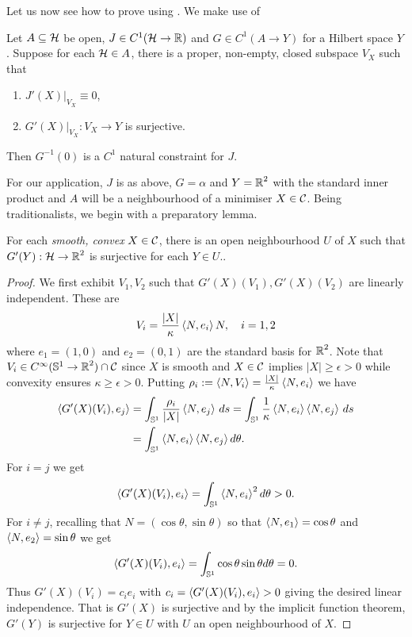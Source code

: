 \documentclass[12pt]{amsart}
\begin{document}
Let us now see how to prove  using . We make use of

\begin{prop}[{\cite[Proposition 2.2]{MR2997381}}]
\label{prop:nat}
Let $A \subseteq \operatorname{\mathcal{H}}$ be open, $J \in C^1(\operatorname{\mathcal{H}} \to \operatorname{\mathbb{R}})$ and $G \in C^1(A \to Y)$ for a Hilbert space $Y$. Suppose for each $\operatorname{\mathcal{H}} \in A$, there is a proper, non-empty, closed subspace $V_X$ such that
\begin{enumerate}
\item $J'(X)|_{V_X} \equiv 0$,
\item $G'(X)|_{V_X} : V_X \to Y$ is surjective.
\end{enumerate}
Then $G^{-1}(0)$ is a \(C^1\) natural constraint for $J$.
\end{prop}

For our application, \(J\) is as above, \(G = \alpha\) and \(Y = \operatorname{\mathbb{R}}^2\) with the standard inner product and $A$ will be a neighbourhood of a minimiser $X \in \operatorname{\mathcal{C}}$. Being traditionalists, we begin with a preparatory lemma.

\begin{lem}
\label{lem:surjective}
For each \emph{smooth, convex} \(X \in \operatorname{\mathcal{C}}\), there is an open neighbourhood $U$ of $X$ such that \(G'(Y) : \operatorname{\mathcal{H}} \to \operatorname{\mathbb{R}}^2\) is surjective for each $Y \in U$..
\end{lem}

\begin{proof}
We first exhibit \(V_1, V_2\) such that \(G'(X) (V_1), G'(X) (V_2)\) are linearly independent. These are
\[
V_i = \frac{|X|}{\kappa}\left\langle{N},{e_i}\right\rangle N, \quad i = 1, 2
\]
where $e_1 = (1, 0)$ and $e_2 = (0, 1)$ are the standard basis for $\operatorname{\mathbb{R}}^2$. Note that $V_i \in C^{\infty}(\operatorname{\mathbb{S}^1} \to \operatorname{\mathbb{R}}^2) \cap \operatorname{\mathcal{C}}$ since $X$ is smooth and $X \in \operatorname{\mathcal{C}}$ implies $|X| \geq \epsilon > 0$ while convexity ensures $\kappa \geq \epsilon > 0$. Putting $\rho_i := \left\langle{N},{V_i}\right\rangle = \frac{|X|}{\kappa}\left\langle{N},{e_i}\right\rangle$ we have
\[
\begin{split}
\left\langle{G'(X) (V_i)},{e_j}\right\rangle &= \int_{\operatorname{\mathbb{S}^1}} \frac{\rho_i}{|X|} \left\langle{N},{e_j}\right\rangle \,ds = \int_{\operatorname{\mathbb{S}^1}} \frac{1}{\kappa} \left\langle{N},{e_i}\right\rangle \left\langle{N},{e_j}\right\rangle \,ds \\
&= \int_{\operatorname{\mathbb{S}^1}} \left\langle{N},{e_i}\right\rangle \left\langle{N},{e_j}\right\rangle d\theta.
\end{split}
\]
For $i=j$ we get
\[
\left\langle{G'(X) (V_i)},{e_i}\right\rangle = \int_{\operatorname{\mathbb{S}^1}} \left\langle{N},{e_i}\right\rangle^2 d\theta > 0.
\]
For $i \ne j$, recalling that $N = (\cos\theta, \sin\theta)$ so that $\left\langle{N},{e_1}\right\rangle = \cos\theta$ and $\left\langle{N},{e_2}\right\rangle = \sin\theta$ we get
\[
\left\langle{G'(X) (V_i)},{e_i}\right\rangle = \int_{\operatorname{\mathbb{S}^1}} \cos\theta\sin\theta d\theta = 0.
\]
Thus $G'(X)(V_i) = c_i e_i$ with $c_i = \left\langle{G'(X) (V_i)},{e_i}\right\rangle > 0$ giving the desired linear independence. That is $G'(X)$ is surjective and by the implicit function theorem, $G'(Y)$ is surjective for $Y \in U$ with $U$ an open neighbourhood of $X$.
\end{proof}
\end{document}
